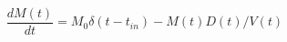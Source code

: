 \begin{equation}
\frac{d M(t)}{dt} = M_0 \delta(t-t_{in}) - M(t)D(t)/V(t)
\end{equation}\begin{equation}

\end{equation}
